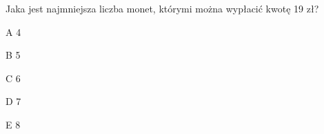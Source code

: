 \begin{tresc}
Jaka jest najmniejsza liczba monet, którymi można wypłacić kwotę 19 zł?
\end{tresc}
\begin{wariant}{A} 4 \end{wariant}
\begin{wariant}{B} 5 \end{wariant}
\begin{wariant}{C} 6 \end{wariant}
\begin{wariant}{D} 7 \end{wariant}
\begin{wariant}{E} 8 \end{wariant}
